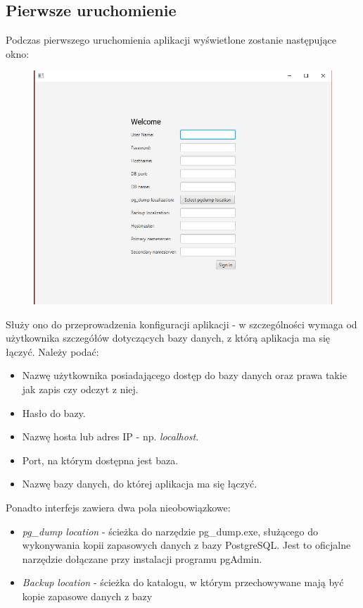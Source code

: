 \documentclass[12pt] {article}
\begin{document}
\subsection{Pierwsze uruchomienie}
Podczas pierwszego uruchomienia aplikacji wyświetlone zostanie następujące okno:
\begin{figure}[H]
\centering
\includegraphics[scale=0.5]{res/1_konfiguracja}
\end{figure}
Służy ono do przeprowadzenia konfiguracji aplikacji - w szczególności wymaga od użytkownika szczegółów dotyczących bazy danych, z którą aplikacja ma się łączyć. Należy podać:
\begin{itemize}
\item Nazwę użytkownika posiadającego dostęp do bazy danych oraz prawa takie jak zapis czy odczyt z niej.
\item Hasło do bazy.
\item Nazwę hosta lub adres IP - np. \emph{localhost}.
\item Port, na którym dostępna jest baza.
\item Nazwę bazy danych, do której aplikacja ma się łączyć.
\end{itemize}
Ponadto interfejs zawiera dwa pola nieobowiązkowe:
\begin{itemize}
\item \emph{pg\_dump location} - ścieżka do narzędzie pg\_dump.exe, służącego do wykonywania kopii zapasowych danych z bazy PostgreSQL. Jest to oficjalne narzędzie dołączane przy instalacji programu pgAdmin.
\item \emph{Backup location} - ścieżka do katalogu, w którym przechowywane mają być kopie zapasowe danych z bazy
\end{itemize}
\end{document}
